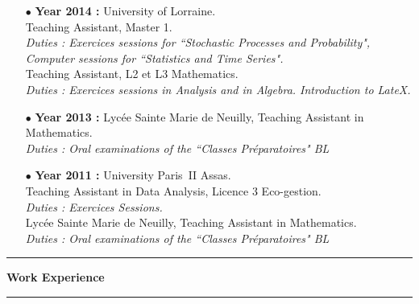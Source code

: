 \documentclass[a4paper,11pt]{article}
\newcommand{\titre}[1]{%
	\begin{center}
	\bigskip
	\rule{\textwidth}{1pt}
	\par\vspace{0.1cm}
        \textbf{\large #1}
	\par\rule{\textwidth}{1pt}
	\end{center}
	\bigskip
	}
\begin{document}
\begin{itemize}
\item[$\bullet$] \textbf{ Year 2014 :}  University of Lorraine.\\
					Teaching Assistant, Master 1. \\
					\textit{Duties : Exercices sessions for ``Stochastic Processes and Probability", Computer sessions for ``Statistics and Time Series".}\\
					Teaching Assistant, L2 et L3 Mathematics. \\
					\textit{Duties : Exercices sessions in Analysis and in Algebra. Introduction to LateX.}\\
\item[$\bullet$] \textbf{ Year 2013 :} Lycée Sainte Marie de Neuilly, Teaching Assistant in Mathematics. \\
					\textit{Duties : Oral examinations of the ``Classes Préparatoires" BL} \\
\newpage
\item[$\bullet$] \textbf{ Year 2011 :} University Paris~II Assas.\\
					Teaching Assistant in Data Analysis, Licence 3 Eco-gestion.\\
					\textit{Duties : Exercices Sessions.}\\
					Lycée Sainte Marie de Neuilly, Teaching Assistant in Mathematics. \\
					\textit{Duties : Oral examinations of the ``Classes Préparatoires" BL} 
\end{itemize}

\titre{Work Experience}
\end{document}

